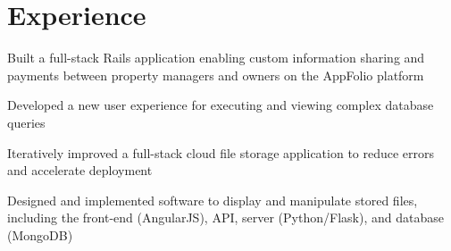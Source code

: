 \section{Experience}

\begin{tightemize}
\item Built a full-stack Rails application enabling custom information sharing and payments between property managers and owners on the AppFolio platform
\item Developed a new user experience for executing and viewing complex database queries
\end{tightemize}
\sectionsep

\begin{tightemize}
\item Iteratively improved a full-stack cloud file storage application to reduce errors and accelerate deployment
\item Designed and implemented software to display and manipulate stored files, including the front-end (AngularJS), API, server (Python/Flask), and database (MongoDB)
\end{tightemize}
\sectionsep
